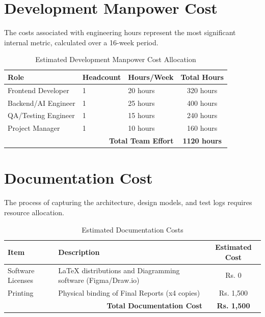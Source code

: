 \section{Development Manpower Cost}
The costs associated with engineering hours represent the most significant internal metric, calculated over a 16-week period.
\begin{table}[h!]
\centering
\begin{tabular}{|l|l|p{3cm}|c|}
\hline
\textbf{Role} & \textbf{Headcount} & \textbf{Hours/Week} & \textbf{Total Hours} \\ \hline
Frontend Developer & 1 & 20 hours & 320 hours \\ \hline
Backend/AI Engineer & 1 & 25 hours & 400 hours \\ \hline
QA/Testing Engineer & 1 & 15 hours & 240 hours \\ \hline
Project Manager & 1 & 10 hours & 160 hours \\ \hline
\multicolumn{3}{|r|}{\textbf{Total Team Effort}} & \textbf{1120 hours} \\ \hline
\end{tabular}
\caption{Estimated Development Manpower Cost Allocation}
\end{table}

\section{Documentation Cost}
The process of capturing the architecture, design models, and test logs requires resource allocation.
\begin{table}[h!]
\centering
\begin{tabular}{|l|p{5cm}|c|}
\hline
\textbf{Item} & \textbf{Description} & \textbf{Estimated Cost} \\ \hline
Software Licenses & LaTeX distributions and Diagramming software (Figma/Draw.io) & Rs. 0 \\ \hline
Printing & Physical binding of Final Reports (x4 copies) & Rs. 1,500 \\ \hline
\multicolumn{2}{|r|}{\textbf{Total Documentation Cost}} & \textbf{Rs. 1,500} \\ \hline
\end{tabular}
\caption{Estimated Documentation Costs}
\end{table}

